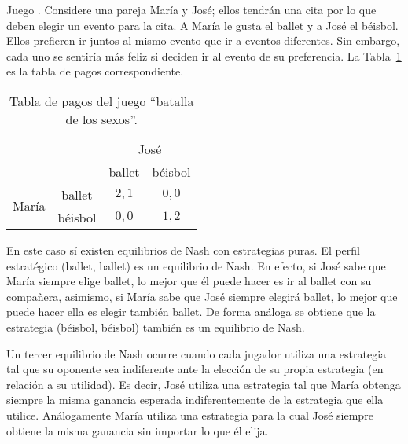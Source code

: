 \begin{example}
\label{ex:batalla-sexos}
Juego . Considere una pareja María y José; ellos tendrán una cita por lo que deben elegir un evento para la cita. A María le gusta el ballet y a José el béisbol. Ellos prefieren ir juntos al mismo evento que ir a eventos diferentes. Sin embargo, cada uno se sentiría más feliz si deciden ir al evento de su preferencia. La Tabla~\ref{table:pagos-batallas-sexo} es la tabla de pagos correspondiente.
\end{example}

\begin{table}[h]
\begin{center}
\caption{Tabla de pagos del juego ``batalla de los sexos''.}
\label{table:pagos-batallas-sexo}
\begin{tabular}{ c c | c | c |}
 & \multicolumn{1}{c}{} & \multicolumn{2}{c}{José} \\
 & \multicolumn{1}{c}{} & \multicolumn{1}{c}{ballet} & \multicolumn{1}{c}{béisbol}  \\ \cline{3-4}
 \multirow{2}{*}{María}
 & ballet  & $2, 1$ & $0, 0$ \\ \cline{3-4}
 & béisbol & $0, 0$ & $1, 2$ \\ \cline{3-4}
\end{tabular}
\end{center}
\end{table}

En este caso sí existen equilibrios de Nash con estrategias puras. El perfil estratégico (ballet, ballet) es un equilibrio de Nash. En efecto, si José sabe que María siempre elige ballet, lo mejor que él puede hacer es ir al ballet con su compañera, asimismo, si María sabe que José siempre elegirá ballet, lo mejor que puede hacer ella es elegir también ballet. De forma análoga se obtiene que la estrategia (béisbol, béisbol) también es un equilibrio de Nash.

Un tercer equilibrio de Nash ocurre cuando cada jugador utiliza una estrategia tal que su oponente sea indiferente ante la elección de su propia estrategia (en relación a su utilidad). Es decir, José utiliza una estrategia tal que María obtenga siempre la misma ganancia esperada indiferentemente de la estrategia que ella utilice. Análogamente María utiliza una estrategia para la cual José siempre obtiene la misma ganancia sin importar lo que él elija.

